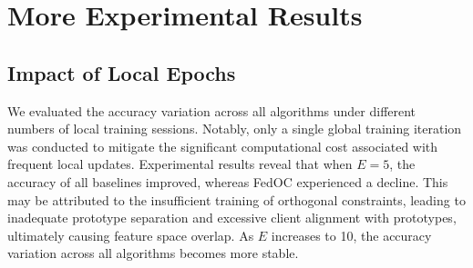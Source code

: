 \setcounter{page}{1}
\maketitlesupplementary

\section{More Experimental Results}
\label{sec:more experimental results}
\subsection{Impact of Local Epochs}
We evaluated the accuracy variation across all algorithms under different numbers of local training sessions. Notably, only a single global training iteration was conducted to mitigate the significant computational cost associated with frequent local updates. Experimental results reveal that when $E=5$, the accuracy of all baselines improved, whereas FedOC experienced a decline. This may be attributed to the insufficient training of orthogonal constraints, leading to inadequate prototype separation and excessive client alignment with prototypes, ultimately causing feature space overlap. As $E$ increases to 10, the accuracy variation across all algorithms becomes more stable.

\begin{table}[ht]
\caption{The test accuracy (\%) on Cifar100 with various local epochs under the pathological setting.}
\label{tab:test various local epochs} %
\centering
{}
\end{table}

